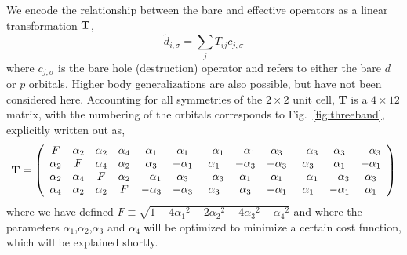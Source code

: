 We encode the relationship between the bare and effective operators as a linear transformation ${\bf T}$, 
\begin{equation}
	\tilde{d}_{i,\sigma} = \sum_{j} T_{ij} c_{j,\sigma}
\end{equation}
where $c_{j,\sigma}$ is the bare hole (destruction) operator and refers to either the bare $d$ or $p$ orbitals. 
Higher body generalizations are also possible, but have not been considered here. 
Accounting for all symmetries of the $2\times2$ unit cell, {\bf T} is a $4 \times 12 $ matrix, with 
the numbering of the orbitals corresponds to Fig.~\ref{fig:threeband}, explicitly written out as, 
\begin{eqnarray}
{\bf T} = 
\left(
\begin{array}{cccccccccccc}
F        & \alpha_2 &        \alpha_2 &  \alpha_4 & \alpha_1 & \alpha_1 & -\alpha_1 & -\alpha_1 & \alpha_3 & -\alpha_3 & \alpha_3 & -\alpha_3 \\
\alpha_2 &  F       &        \alpha_4 &  \alpha_2 & \alpha_3 & -\alpha_1 & \alpha_1 & -\alpha_3 & -\alpha_3 & \alpha_3 & \alpha_1 & -\alpha_1 \\
\alpha_2 & \alpha_4 & F               &  \alpha_2 & -\alpha_1 & \alpha_3 & -\alpha_3 & \alpha_1 & \alpha_1 & -\alpha_1 & -\alpha_3 & \alpha_3 \\
\alpha_4 & \alpha_2 & \alpha_2        &   F       & -\alpha_3 & -\alpha_3 & \alpha_3 & \alpha_3 & -\alpha_1 & \alpha_1 & -\alpha_1 & \alpha_1 \\
\end{array}
\right)
\end{eqnarray}
where we have defined $F \equiv \sqrt{1-4{\alpha_1}^2 - 2{\alpha_2}^2 - 4 {\alpha_3}^2 -{\alpha_4}^2}$ and 
where the parameters $\alpha_1$,$\alpha_2$,$\alpha_3$ and $\alpha_4$ will be optimized to minimize a 
certain cost function, which will be explained shortly. 

